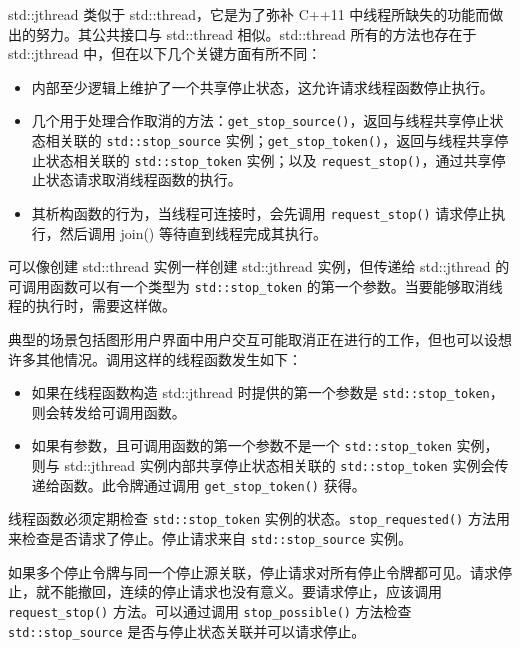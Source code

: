 
std::jthread 类似于 std::thread，它是为了弥补 C++11 中线程所缺失的功能而做出的努力。其公共接口与 std::thread 相似。std::thread 所有的方法也存在于 std::jthread 中，但在以下几个关键方面有所不同：

\begin{itemize}
\item
内部至少逻辑上维护了一个共享停止状态，这允许请求线程函数停止执行。

\item
几个用于处理合作取消的方法：\verb|get_stop_source()|，返回与线程共享停止状态相关联的 \verb|std::stop_source| 实例；\verb|get_stop_token()|，返回与线程共享停止状态相关联的 \verb|std::stop_token| 实例；以及 \verb|request_stop()|，通过共享停止状态请求取消线程函数的执行。

\item
其析构函数的行为，当线程可连接时，会先调用 \verb|request_stop()| 请求停止执行，然后调用 join() 等待直到线程完成其执行。
\end{itemize}

可以像创建 std::thread 实例一样创建 std::jthread 实例，但传递给 std::jthread 的可调用函数可以有一个类型为 \verb|std::stop_token| 的第一个参数。当要能够取消线程的执行时，需要这样做。

典型的场景包括图形用户界面中用户交互可能取消正在进行的工作，但也可以设想许多其他情况。调用这样的线程函数发生如下：

\begin{itemize}
\item
如果在线程函数构造 std::jthread 时提供的第一个参数是 \verb|std::stop_token|，则会转发给可调用函数。

\item
如果有参数，且可调用函数的第一个参数不是一个 \verb|std::stop_token| 实例，则与 std::jthread 实例内部共享停止状态相关联的 \verb|std::stop_token| 实例会传递给函数。此令牌通过调用 \verb|get_stop_token()| 获得。
\end{itemize}

线程函数必须定期检查 \verb|std::stop_token| 实例的状态。\verb|stop_requested()| 方法用来检查是否请求了停止。停止请求来自 \verb|std::stop_source| 实例。

如果多个停止令牌与同一个停止源关联，停止请求对所有停止令牌都可见。请求停止，就不能撤回，连续的停止请求也没有意义。要请求停止，应该调用 \verb|request_stop()| 方法。可以通过调用 \verb|stop_possible()| 方法检查 \verb|std::stop_source| 是否与停止状态关联并可以请求停止。

